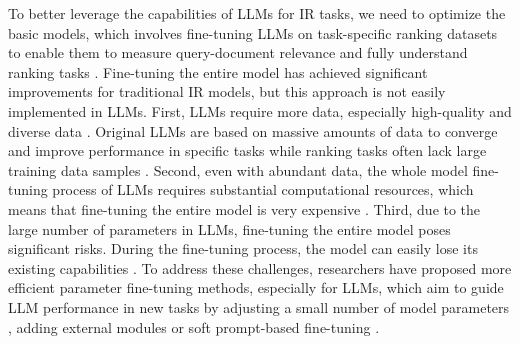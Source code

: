 \documentclass[sigconf,natbib=true,anonymous=false]{acmart}
\begin{document}
To better leverage the capabilities of LLMs for IR tasks, we need to optimize the basic models, which involves fine-tuning LLMs on task-specific ranking datasets to enable them to measure query-document relevance and fully understand ranking tasks \cite{DBLP:journals/corr/abs-1910-14424, DBLP:conf/sigir/JuYW21, DBLP:journals/corr/abs-2101-05667, DBLP:journals/corr/abs-2310-08319}. Fine-tuning the entire model has achieved significant improvements for traditional IR models, but this approach is not easily implemented in LLMs. First, LLMs require more data, especially high-quality and diverse data \cite{DBLP:conf/nips/BrownMRSKDNSSAA20}. Original LLMs are based on massive amounts of data to converge and improve performance in specific tasks while ranking tasks often lack large training data samples \cite{DBLP:journals/tmlr/WeiTBRZBYBZMCHVLDF22}. Second, even with abundant data, the whole model fine-tuning process of LLMs requires substantial computational resources, which means that fine-tuning the entire model is very expensive \cite{DBLP:journals/corr/abs-2302-13971}. Third, due to the large number of parameters in LLMs, fine-tuning the entire model poses significant risks. During the fine-tuning process, the model can easily lose its existing capabilities \cite{DBLP:journals/corr/abs-2309-01219}. To address these challenges, researchers have proposed more efficient parameter fine-tuning methods, especially for LLMs, which aim to guide LLM performance in new tasks by adjusting a small number of model parameters \cite{DBLP:conf/iclr/HuSWALWWC22}, adding external modules \cite{DBLP:conf/icml/HoulsbyGJMLGAG19} or soft prompt-based fine-tuning \cite{DBLP:conf/acl/LiL20, DBLP:journals/corr/abs-2103-10385, DBLP:conf/emnlp/LesterAC21}.
\end{document}
